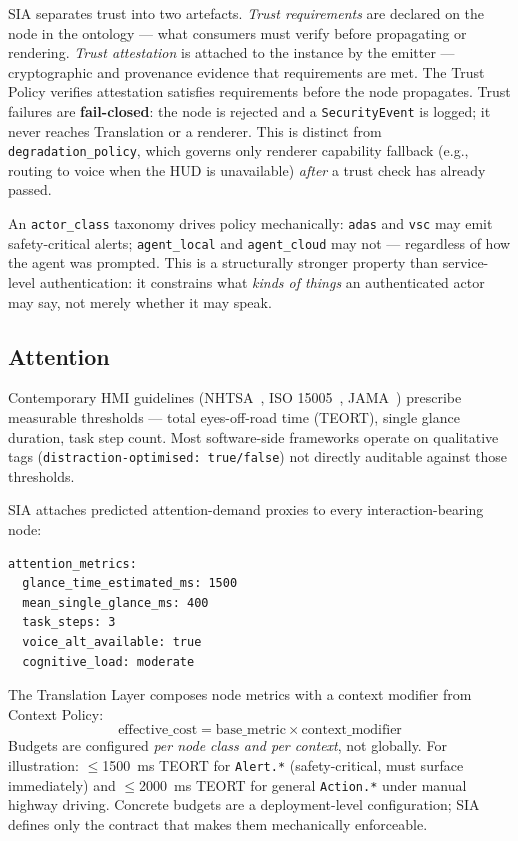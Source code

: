\documentclass[manuscript,screen,review,anonymous]{acmart}
\begin{document}
SIA separates trust into two artefacts. \emph{Trust requirements} are declared
on the node in the ontology --- what consumers must verify before propagating
or rendering. \emph{Trust attestation} is attached to the instance by the
emitter --- cryptographic and provenance evidence that requirements are met.
The Trust Policy verifies attestation satisfies requirements before the node
propagates. Trust failures are \textbf{fail-closed}: the node is rejected and a
\texttt{SecurityEvent} is logged; it never reaches Translation or a renderer.
This is distinct from \texttt{degradation\_policy}, which governs only renderer
capability fallback (e.g., routing to voice when the HUD is unavailable)
\emph{after} a trust check has already passed.

An \texttt{actor\_class} taxonomy drives policy mechanically: \texttt{adas} and
\texttt{vsc} may emit safety-critical alerts; \texttt{agent\_local} and
\texttt{agent\_cloud} may not --- regardless of how the agent was prompted.
This is a structurally stronger property than service-level authentication: it
constrains what \emph{kinds of things} an authenticated actor may say, not
merely whether it may speak.

\subsection{Attention}

Contemporary HMI guidelines (NHTSA~\cite{nhtsa2013}, ISO 15005~\cite{iso15005}, JAMA~\cite{jama2004}) prescribe
measurable thresholds --- total eyes-off-road time (TEORT), single glance
duration, task step count. Most software-side frameworks operate on qualitative
tags (\texttt{distraction-optimised: true/false}) not directly auditable
against those thresholds.

SIA attaches predicted attention-demand proxies to every interaction-bearing
node:

\begin{lstlisting}[language={}]
attention_metrics:
  glance_time_estimated_ms: 1500
  mean_single_glance_ms: 400
  task_steps: 3
  voice_alt_available: true
  cognitive_load: moderate
\end{lstlisting}

The Translation Layer composes node metrics with a context modifier from
Context Policy:
\[
  \text{effective\_cost} = \text{base\_metric} \times \text{context\_modifier}
\]
Budgets are configured \emph{per node class and per context}, not globally.
For illustration: $\le$1500~ms TEORT for \texttt{Alert.*} (safety-critical,
must surface immediately) and $\le$2000~ms TEORT for general \texttt{Action.*}
under manual highway driving. Concrete budgets are a deployment-level
configuration; SIA defines only the contract that makes them mechanically
enforceable.
\end{document}
